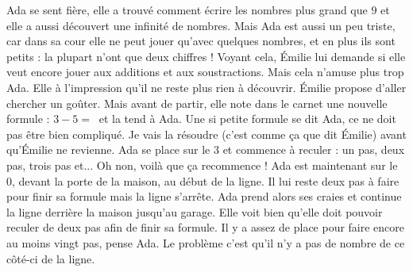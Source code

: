 Ada se sent fière, elle a trouvé comment écrire les nombres plus grand que $9$ et elle a aussi découvert une infinité de nombres. 
Mais Ada est aussi un peu triste, car dans sa cour elle ne peut jouer qu’avec quelques nombres, et en plus ils sont petits : la plupart n’ont que deux chiffres !
Voyant cela, Émilie lui demande si elle veut encore jouer aux additions et aux soustractions. 
Mais cela n’amuse plus trop Ada. Elle à l’impression qu’il ne reste plus rien à découvrir. 
Émilie propose d’aller chercher un goûter. Mais avant de partir, elle note dans le carnet une nouvelle formule : $3 - 5 = ~$ et la tend à Ada. 
Une si petite formule se dit Ada, ce ne doit pas être bien compliqué. 
Je vais la résoudre (c’est comme ça que dit Émilie) avant qu’Émilie ne revienne. 
Ada se place sur le $3$ et commence à reculer : un pas, deux pas, trois pas et... 
Oh non, voilà que ça recommence ! Ada est maintenant sur le $0$, devant la porte de la maison, au début de la ligne. 
Il lui reste deux pas à faire pour finir sa formule mais la ligne s’arrête. 
Ada prend alors ses craies et continue la ligne derrière la maison jusqu’au garage. 
Elle voit bien qu’elle doit pouvoir reculer de deux pas afin de finir sa formule. 
Il y a assez de place pour faire encore au moins vingt pas, pense Ada. 
Le problème c’est qu’il n’y a pas de nombre de ce côté-ci de la ligne. 

